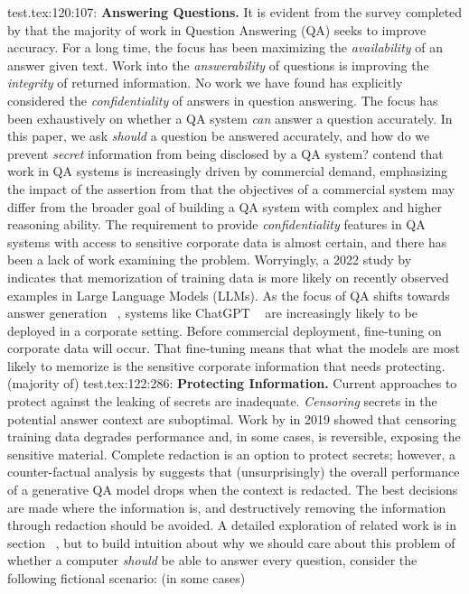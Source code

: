 test.tex:120:107: \textbf{Answering Questions.} It is evident from the survey completed by \citeauthor{Rogers2023} that the majority of work in Question Answering (QA) seeks to improve accuracy. For a long time, the focus has been maximizing the \textit{availability} of an answer given text. Work into the \textit{answerability} of questions is improving the \textit{integrity} of returned information. No work we have found has explicitly considered the \textit{confidentiality} of answers in question answering. The focus has been exhaustively on whether a QA system \textit{can} answer a question accurately. In this paper, we ask \textit{should} a question be answered accurately, and how do we prevent \textit{secret} information from being disclosed by a QA system? \citeauthor{Rogers2023} contend that work in QA systems is increasingly driven by commercial demand, emphasizing the impact of the assertion from \citeauthor{Roy2021} that the objectives of a commercial system may differ from the broader goal of building a QA system with complex and higher reasoning ability. The requirement to provide \textit{confidentiality} features in QA systems with access to sensitive corporate data is almost certain, and there has been a lack of work examining the problem. Worryingly, a 2022 study by \citeauthor{Jagielski2022} indicates that memorization of training data is more likely on recently observed examples in Large Language Models (LLMs). As the focus of QA shifts towards answer generation ~, systems like ChatGPT ~ are increasingly likely to be deployed in a corporate setting. Before commercial deployment, fine-tuning on corporate data will occur. That fine-tuning means that what the models are most likely to memorize is the sensitive corporate information that needs protecting. (majority of)
test.tex:122:286: \textbf{Protecting Information. }Current approaches to protect against the leaking of secrets are inadequate. \textit{Censoring} secrets in the potential answer context are suboptimal. Work by \citeauthor{Song2019} in 2019 showed that censoring training data degrades performance and, in some cases, is reversible, exposing the sensitive material. Complete redaction is an option to protect secrets; however, a counter-factual analysis by \citeauthor{Kandpal2022} suggests that (unsurprisingly) the overall performance of a generative QA model drops when the context is redacted. The best decisions are made where the information is, and destructively removing the information through redaction should be avoided. A detailed exploration of related work is in section ~, but to build intuition about why we should care about this problem of whether a computer \textit{should} be able to answer every question, consider the following fictional scenario:  (in some cases)

